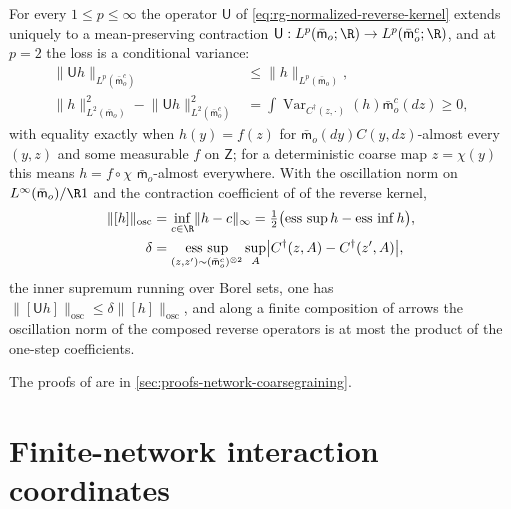 For every $1\le p\le\infty$ the operator $\mathsf U$ of
\eqref{eq:rg-normalized-reverse-kernel} extends uniquely to a mean-preserving
contraction $\mathsf U:L^p(\bar{\mathsf m}_o;\R)\to L^p(\bar{\mathsf m}_o^c;\R)$,
and at $p=2$ the loss is a conditional variance:
\begin{align}
\lVert\mathsf Uh\rVert_{L^p(\bar{\mathsf m}_o^c)}&\le\lVert h\rVert_{L^p(\bar{\mathsf m}_o)},
\label{eq:rg-action-lp-contraction}\\
\lVert h\rVert_{L^2(\bar{\mathsf m}_o)}^2-\lVert\mathsf Uh\rVert_{L^2(\bar{\mathsf m}_o^c)}^2
&=\int\operatorname{Var}_{C^\dagger(z,\cdot)}(h)\bar{\mathsf m}_o^c(dz)\ge0,
\label{eq:rg-action-l2-conditional-defect}
\end{align}
with equality exactly when $h(y)=f(z)$ for $\bar{\mathsf m}_o(dy)C(y,dz)$-almost
every $(y,z)$ and some measurable $f$ on $\mathsf Z$; for a deterministic coarse
map $z=\chi(y)$ this means $h=f\circ\chi$ $\bar{\mathsf m}_o$-almost everywhere.
With the oscillation norm on $L^\infty(\bar{\mathsf m}_o)/\R1$ and the contraction
coefficient of \citet{Dobrushin1956} of the reverse kernel,
\begin{align}
\lVert[h]\rVert_{\mathrm{osc}}
&=\inf_{c\in\R}\lVert h-c\rVert_\infty
=\tfrac12\bigl(\operatorname*{ess~sup}h-\operatorname*{ess~inf}h\bigr),
\label{eq:rg-action-oscillation-norm}\\
\delta&=
\operatorname*{ess~sup}_{(z,z')\sim(\bar{\mathsf m}_o^c)^{\otimes2}}
\sup_{A}\bigl\lvert C^\dagger(z,A)-C^\dagger(z',A)\bigr\rvert,
\label{eq:rg-action-dobrushin-coefficient}
\end{align}
the inner supremum running over Borel sets, one has
$\lVert[\mathsf Uh]\rVert_{\mathrm{osc}}\le\delta\lVert[h]\rVert_{\mathrm{osc}}$, and
along a finite composition of arrows the oscillation norm of the composed reverse
operators is at most the product of the one-step coefficients.

The proofs of 
are in \cref{sec:proofs-network-coarsegraining}.

\section{Finite-network interaction coordinates}
\label{sec:rg-finite-network-interactions}

